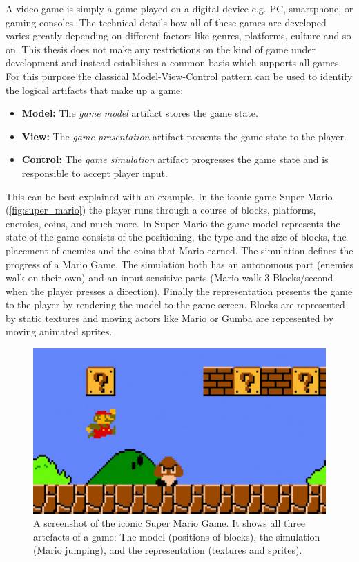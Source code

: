 A video game is simply a game played on a digital device e.g. PC, smartphone, or
gaming consoles. The technical details how all of these games are developed
varies greatly depending on different factors like genres, platforms, culture
and so on. This thesis does not make any restrictions on the kind of game
under development and instead establishes a common basis which supports all
games. For this purpose the classical Model-View-Control pattern can be used to
identify the logical artifacts that make up a game: 

\begin{itemize}
  \item \textbf{Model:} The \textit{game model} artifact stores the game state.
  \item \textbf{View:} The \textit{game presentation} artifact presents the game
  state to the player.
  \item \textbf{Control:} The \textit{game simulation} artifact progresses the
  game state and is responsible to accept player input.
\end{itemize}

This can be best explained with an example. In the iconic game Super Mario
(\autoref{fig:super_mario}) the player runs through a course of blocks,
platforms, enemies, coins, and much more. In Super Mario the game model
represents the state of the game consists of the positioning, the type and the
size of blocks, the placement of enemies and the coins that Mario earned. The
simulation defines the progress of a Mario Game. The simulation both has an
autonomous part (enemies walk on their own) and an input sensitive parts (Mario
walk 3 Blocks/second when the player presses a direction). Finally the
representation presents the game to the player by rendering the model to the
game screen. Blocks are represented by static textures and moving actors like
Mario or Gumba are represented by moving animated sprites.

\begin{figure}
	\centering
	\includegraphics[width=\textwidth]{images/super_mario}
	\caption{A screenshot of the iconic Super Mario Game. It shows all three
	artefacts of a game: The model (positions of blocks), the simulation (Mario
	jumping), and the representation (textures and sprites).}
	\label{fig:super_mario}
\end{figure}

